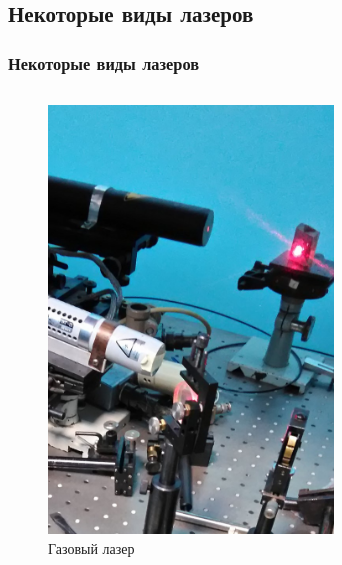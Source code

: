 \documentclass[10pt,pdf,hyperref={unicode}, dvipsnames]{beamer}
\newcommand\frametitless[1]{\subsection{#1}\frametitle{#1}}
\begin{document}
\begin{frame}[t]
	\frametitless{Некоторые виды лазеров}
	\vspace{-1em}

	\begin{columns}
		\begin{column}{0.3\textwidth}
			\begin{figure}[h]
				\centering
				\includegraphics[width=0.8\textwidth]{photo/las_g}
				\caption{Газовый лазер}
			\end{figure}	
		\end{column}
		\begin{column}{0.3\textwidth}
			\begin{figure}[h]
				\centering

\end{figure}
\end{column}
\end{columns}
\end{frame}
\end{document}
